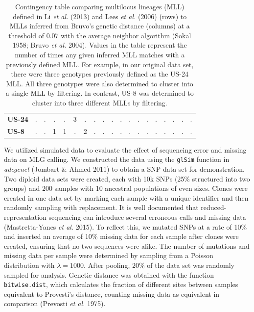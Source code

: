 \documentclass[double,12pt]{beavtex}
\begin{document}
\begin{table}
\begin{tabular}{l|cccccccccccccccccc}
    \textbf{US-24} & . & . & . & . & 3 & . & . & . & . & . & . & . & . & . & . & . & . & . \\ 
    \textbf{US-8} & . & . & 1 & 1 & . & 2 & . & . & . & . & . & . & . & . & . & . & . & . \\ 
     \bottomrule
  \end{tabular}
  \caption[Contingency table comparing multilocus lineages (MLL)]{Contingency table comparing multilocus lineages (MLL) defined in Li
  \emph{et al.} (2013) and Lees \emph{et al.} (2006) (rows) to MLLs
  inferred from Bruvo's genetic distance (columns) at a threshold of 0.07
  with the average neighbor algorithm (Sokal 1958; Bruvo \emph{et al.}
  2004). Values in the table represent the number of times any given
  inferred MLL matches with a previously defined MLL. For example, in our
  original data set, there were three genotypes previously defined as the
  US-24 MLL. All three genotypes were also determined to cluster into a
  single MLL by filtering. In contrast, US-8 was determined to cluster
  into three different MLLs by filtering.} 
  \label{pinftable}
  \end{table}
  
  \newpage
  
  We utilized simulated data to evaluate the effect of sequencing error
  and missing data on MLG calling. We constructed the data using the
  \texttt{glSim} function in \emph{adegenet} (Jombart \& Ahmed 2011) to
  obtain a SNP data set for demonstration. Two diploid data sets were
  created, each with 10k SNPs (25\% structured into two groups) and 200
  samples with 10 ancestral populations of even sizes. Clones were created
  in one data set by marking each sample with a unique identifier and then
  randomly sampling with replacement. It is well documented that reduced-
  representation sequencing can introduce several erroneous calls and
  missing data (Mastretta-Yanes \emph{et al.} 2015). To reflect this, we
  mutated SNPs at a rate of 10\% and inserted an average of 10\% missing
  data for each sample after clones were created, ensuring that no two
  sequences were alike. The number of mutations and missing data per
  sample were determined by sampling from a Poisson distribution with
  \(\lambda = 1000\). After pooling, 20\% of the data set was randomly
  sampled for analysis. Genetic distance was obtained with the function
  \texttt{bitwise.dist}, which calculates the fraction of different sites
  between samples equivalent to Provesti's distance, counting missing data
  as equivalent in comparison (Prevosti \emph{et al.} 1975).
  
\end{document}

